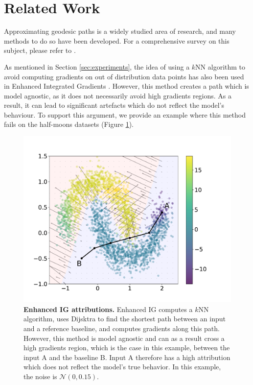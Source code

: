 \section{Related Work}
\label{sec:related_work}

Approximating geodesic paths is a widely studied area of research, and many methods to do so have been developed. For a comprehensive survey on this subject, please refer to \citet{crane2020survey}.

As mentioned in Section \ref{sec:experiments}, the idea of using a $k$NN algorithm to avoid computing gradients on out of distribution data points has also been used in Enhanced Integrated Gradients \citet{jha2020enhanced}. However, this method creates a path which is model agnostic, as it does not necessarily avoid high gradients regions. As a result, it can lead to significant artefacts which do not reflect the model's behaviour. To support this argument, we provide an example where this method fails on the half-moons datasets (Figure \ref{fig:enhanced_ig}). 

\begin{figure}[ht]
\vskip -0.2in
\begin{center}
\centerline{\includegraphics[width=\columnwidth]{figures/enhanced_ig_y.pdf}}
\caption{\textbf{Enhanced IG attributions.} Enhanced IG computes a $k$NN algorithm, uses Dijsktra to find the shortest path between an input and a reference baseline, and computes gradients along this path. However, this method is model agnostic and can as a result cross a high gradients region, which is the case in this example, between the input A and the baseline B. Input A therefore has a high attribution which does not reflect the model's true behavior. In this example, the noise is $\mathcal{N}(0, 0.15)$.}
\label{fig:enhanced_ig}
\end{center}
\vskip -0.2in
\end{figure}

